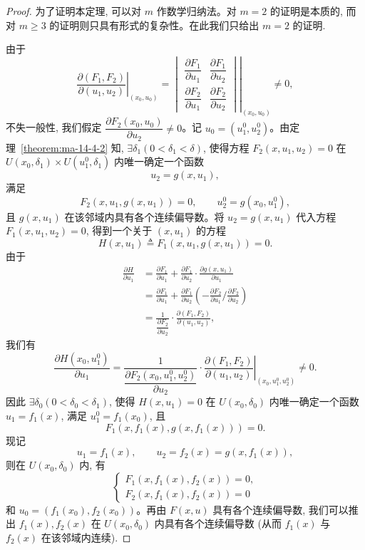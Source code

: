 \begin{proof}
为了证明本定理, 可以对 $m$ 作数学归纳法。对 $m=2$ 的证明是本质的, 而对 $m\geqslant3$ 的证明则只具有形式的复杂性。在此我们只给出 $m=2$ 的证明.

由于
\[
  \left.
  \frac{\partial(F_1,F_2)}{\partial(u_1,u_2)}
  \right|_{(x_0,u_0)}
  =
  \left.
  \begin{vmatrix}
    \dfrac{\partial F_1}{\partial u_1} &
    \dfrac{\partial F_1}{\partial u_2}\\
    \dfrac{\partial F_2}{\partial u_1} &
    \dfrac{\partial F_2}{\partial u_2}
  \end{vmatrix}
  \right|_{(x_0,u_0)}
  \ne0,
\]
不失一般性, 我们假定 $\dfrac{\partial F_2(x_0,u_0)}{\partial u_2}\ne0$。记 $u_0=(u_1^0,u_2^0)$。由定理~\ref{theorem:ma-14-4-2} 知, $\exists\delta_1(0<\delta_1<\delta)$, 使得方程 $F_2(x,u_1,u_2)=0$ 在 $U(x_0,\delta_1)\times U(u_1^0,\delta_1)$ 内唯一确定一个函数
\[
  u_2=g(x,u_1),
\]
满足
\[
  F_2(x,u_1,g(x,u_1))=0,\qquad u_2^0=g(x_0,u_1^0),
\]
且 $g(x,u_1)$ 在该邻域内具有各个连续偏导数。将 $u_2=g(x,u_1)$ 代入方程 $F_1(x,u_1,u_2)=0$, 得到一个关于 $(x,u_1)$ 的方程
\[
  H(x,u_1)\triangleq F_1(x,u_1,g(x,u_1))=0.
\]
由于
\[
\begin{aligned}
  \frac{\partial H}{\partial u_1}
  &=\frac{\partial F_1}{\partial u_1}
  +\frac{\partial F_1}{\partial u_2}\cdot
  \frac{\partial g(x,u_1)}{\partial u_1}\\
  &=\frac{\partial F_1}{\partial u_1}
  +\frac{\partial F_1}{\partial u_2}
  \left(-\frac{\partial F_2}{\partial u_1}\bigg/
  \frac{\partial F_2}{\partial u_2}\right)\\
  &=\frac1{\dfrac{\partial F_2}{\partial u_2}}\cdot
  \frac{\partial(F_1,F_2)}{\partial(u_1,u_2)},
\end{aligned}
\]
我们有
\[
  \frac{\partial H(x_0,u_1^0)}{\partial u_1}
  =\frac1{\dfrac{\partial F_2(x_0,u_1^0,u_2^0)}{\partial u_2}}\cdot
  \left.
  \frac{\partial(F_1,F_2)}{\partial(u_1,u_2)}
  \right|_{(x_0,u_1^0,u_2^0)}
  \ne0.
\]
因此 $\exists\delta_0(0<\delta_0<\delta_1)$, 使得 $H(x,u_1)=0$ 在 $U(x_0,\delta_0)$ 内唯一确定一个函数 $u_1=f_1(x)$, 满足 $u_1^0=f_1(x_0)$, 且
\[
  F_1(x,f_1(x),g(x,f_1(x)))=0.
\]
现记
\[
  u_1=f_1(x),\qquad u_2=f_2(x)=g(x,f_1(x)),
\]
则在 $U(x_0,\delta_0)$ 内, 有
\[
  \begin{cases}
    F_1(x,f_1(x),f_2(x))=0,\\
    F_2(x,f_1(x),f_2(x))=0
  \end{cases}
\]
和 $u_0=(f_1(x_0),f_2(x_0))$。再由 $F(x,u)$ 具有各个连续偏导数, 我们可以推出 $f_1(x),f_2(x)$ 在 $U(x_0,\delta_0)$ 内具有各个连续偏导数 (从而 $f_1(x)$ 与 $f_2(x)$ 在该邻域内连续).


\end{proof}
